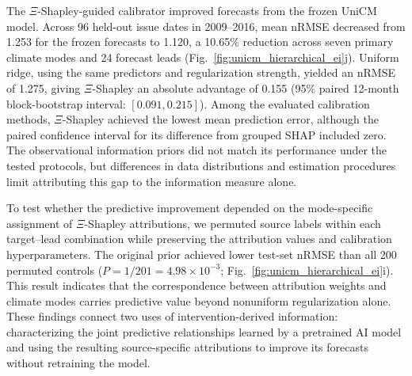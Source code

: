\documentclass[fleqn,10pt]{wlscirep}
\theoremstyle{naturetheorem}
\begin{document}
The $\Xi$-Shapley-guided calibrator improved forecasts from the frozen UniCM model. Across 96 held-out issue dates in 2009--2016, mean nRMSE decreased from 1.253 for the frozen forecasts to 1.120, a 10.65\% reduction across seven primary climate modes and 24 forecast leads (Fig.~\ref{fig:unicm_hierarchical_ei}j). Uniform ridge, using the same predictors and regularization strength, yielded an nRMSE of 1.275, giving $\Xi$-Shapley an absolute advantage of 0.155 (95\% paired 12-month block-bootstrap interval: $[0.091,0.215]$). Among the evaluated calibration methods, $\Xi$-Shapley achieved the lowest mean prediction error, although the paired confidence interval for its difference from grouped SHAP included zero. The observational information priors did not match its performance under the tested protocols, but differences in data distributions and estimation procedures limit attributing this gap to the information measure alone.

To test whether the predictive improvement depended on the mode-specific assignment of $\Xi$-Shapley attributions, we permuted source labels within each target--lead combination while preserving the attribution values and calibration hyperparameters. The original prior achieved lower test-set nRMSE than all 200 permuted controls ($P=1/201=4.98\times10^{-3}$; Fig.~\ref{fig:unicm_hierarchical_ei}i). This result indicates that the correspondence between attribution weights and climate modes carries predictive value beyond nonuniform regularization alone. These findings connect two uses of intervention-derived information: characterizing the joint predictive relationships learned by a pretrained AI model and using the resulting source-specific attributions to improve its forecasts without retraining the model.
\end{document}
